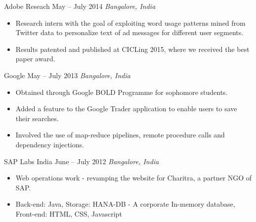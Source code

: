 \documentclass[letterpaper,10pt]{resume}
\begin{document}
{\begin{itemize}
   \credential
      {Adobe Reseach} {May -- July 2014}
      {\textit{Bangalore, India}} {}
      {
		\small \begin{itemize}
			\item{Research intern with the goal of exploiting word usage patterns mined from Twitter data to personalize text of ad messages for different user segments.}
			\item{Results patented and published at CICLing 2015, where we received the best paper award.}
		\end{itemize}		      
      }
  \vspace{0.2cm}

   \credential
      {Google} {May -- July 2013}
      {\textit{Bangalore, India}} {}
      {
		\small \begin{itemize}
			\item{Obtained through Google BOLD Programme for sophomore students.}
			\item{Added a feature to the Google Trader application to enable users to save their searches.}
			\item{Involved the use of map-reduce pipelines, remote procedure calls and dependency injections.}
		\end{itemize}		      
      }
  \vspace{0.2cm}
      
  \credential
      {SAP Labs India} {June -- July 2012}
      {\textit{Bangalore, India}} {}
      {
		\small \begin{itemize}
			\item{Web operations work - revamping the website for Charitra, a partner NGO of SAP.}
			\item{Back-end: Java, Storage: HANA-DB - A corporate In-memory database, Front-end: HTML, CSS, Javascript}
		\end{itemize}		      
      }
         \vspace{0.2cm}
\end{itemize}

}
\end{document}
